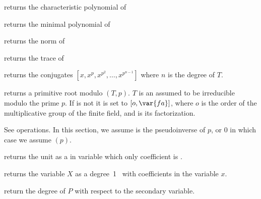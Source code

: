 
 returns the characteristic
polynomial of 

 returns the minimal polynomial
of 


 returns the norm of 

 returns the trace of 

 returns the conjugates
$[x,x^p,x^{p^2},\ldots,x^{p^{n-1}}]$ where $n$ is the degree of $T$.

 returns a primitive root modulo
$(T,p)$. $T$ is an  assumed to be irreducible modulo the prime
$p$. If  is not  it is set to $[o,\var{fa}]$, where $o$ is the
order of the multiplicative group of the finite field, and  is
its factorization.

 See  operations.
In this section, we assume  is the pseudoinverse of $p$, or $0$ in
which case we assume $(p)$.

 returns the unit  as a
 in variable  which only coefficient is .

 returns the variable $X$ as a
degree~1~ with  coefficients in the variable $x$.

 return the degree of $P$ with respect to
the secondary variable.









